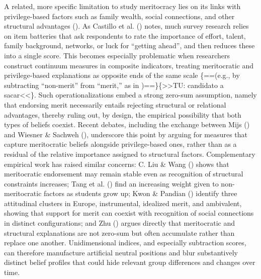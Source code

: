 \documentclass[
  13pt,
]{article}
\begin{document}
A related, more specific limitation to study meritocracy lies on its
links with privilege-based factors such as family wealth, social
connections, and other structural advantages
(). As Castillo
et al. () notes, much
survey research relies on item batteries that ask respondents to rate
the importance of effort, talent, family background, networks, or luck
for ``getting ahead'', and then reduces these into a single score. This
becomes especially problematic when researchers construct continuum
measures in composite indicators, treating meritocratic and
privilege-based explanations as opposite ends of the same scale
\{==(e.g., by subtracting ``non-merit'' from ``merit,'' as in
)==\}\{\textgreater\textgreater TU:
candidato a sacar\textless\textless\}. Such operationalizations embed a
strong zero-sum assumption, namely that endorsing merit necessarily
entails rejecting structural or relational advantages, thereby ruling
out, by design, the empirical possibility that both types of beliefs
coexist. Recent debates, including the exchange between Mijs
() and Wiesner \& Sachweh
(), underscore this point by
arguing for measures that capture meritocratic beliefs alongside
privilege-based ones, rather than as a residual of the relative
importance assigned to structural factors. Complementary empirical work
has raised similar concerns: C. Liu \& Wang
() shows that meritocratic endorsement
may remain stable even as recognition of structural constraints
increases; Tang et al. ()
find an increasing weight given to non-meritocratic factors as students
grow up; Kwon \& Pandian
() identify three
attitudinal clusters in Europe, instrumental, idealized merit, and
ambivalent, showing that support for merit can coexist with recognition
of social connections in distinct configurations; and Zhu
() argues directly that
meritocratic and structural explanations are not zero-sum but often
accumulate rather than replace one another. Unidimensional indices, and
especially subtraction scores, can therefore manufacture artificial
neutral positions and blur substantively distinct belief profiles that
could hide relevant group differences and changes over time.
\end{document}
